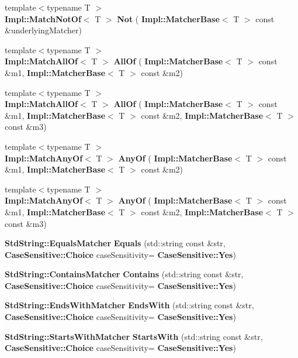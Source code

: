 \begin{DoxyCompactItemize}
\item 
{\footnotesize template$<$typename T $>$ }\\\textbf{ Impl\+::\+Match\+Not\+Of}$<$ T $>$ \textbf{ Not} (\textbf{ Impl\+::\+Matcher\+Base}$<$ T $>$ const \&underlying\+Matcher)
\item 
{\footnotesize template$<$typename T $>$ }\\\textbf{ Impl\+::\+Match\+All\+Of}$<$ T $>$ \textbf{ All\+Of} (\textbf{ Impl\+::\+Matcher\+Base}$<$ T $>$ const \&m1, \textbf{ Impl\+::\+Matcher\+Base}$<$ T $>$ const \&m2)
\item 
{\footnotesize template$<$typename T $>$ }\\\textbf{ Impl\+::\+Match\+All\+Of}$<$ T $>$ \textbf{ All\+Of} (\textbf{ Impl\+::\+Matcher\+Base}$<$ T $>$ const \&m1, \textbf{ Impl\+::\+Matcher\+Base}$<$ T $>$ const \&m2, \textbf{ Impl\+::\+Matcher\+Base}$<$ T $>$ const \&m3)
\item 
{\footnotesize template$<$typename T $>$ }\\\textbf{ Impl\+::\+Match\+Any\+Of}$<$ T $>$ \textbf{ Any\+Of} (\textbf{ Impl\+::\+Matcher\+Base}$<$ T $>$ const \&m1, \textbf{ Impl\+::\+Matcher\+Base}$<$ T $>$ const \&m2)
\item 
{\footnotesize template$<$typename T $>$ }\\\textbf{ Impl\+::\+Match\+Any\+Of}$<$ T $>$ \textbf{ Any\+Of} (\textbf{ Impl\+::\+Matcher\+Base}$<$ T $>$ const \&m1, \textbf{ Impl\+::\+Matcher\+Base}$<$ T $>$ const \&m2, \textbf{ Impl\+::\+Matcher\+Base}$<$ T $>$ const \&m3)
\item 
\textbf{ Std\+String\+::\+Equals\+Matcher} \textbf{ Equals} (std\+::string const \&str, \textbf{ Case\+Sensitive\+::\+Choice} case\+Sensitivity=\textbf{ Case\+Sensitive\+::\+Yes})
\item 
\textbf{ Std\+String\+::\+Contains\+Matcher} \textbf{ Contains} (std\+::string const \&str, \textbf{ Case\+Sensitive\+::\+Choice} case\+Sensitivity=\textbf{ Case\+Sensitive\+::\+Yes})
\item 
\textbf{ Std\+String\+::\+Ends\+With\+Matcher} \textbf{ Ends\+With} (std\+::string const \&str, \textbf{ Case\+Sensitive\+::\+Choice} case\+Sensitivity=\textbf{ Case\+Sensitive\+::\+Yes})
\item 
\textbf{ Std\+String\+::\+Starts\+With\+Matcher} \textbf{ Starts\+With} (std\+::string const \&str, \textbf{ Case\+Sensitive\+::\+Choice} case\+Sensitivity=\textbf{ Case\+Sensitive\+::\+Yes})
\item 

\end{DoxyCompactItemize}
